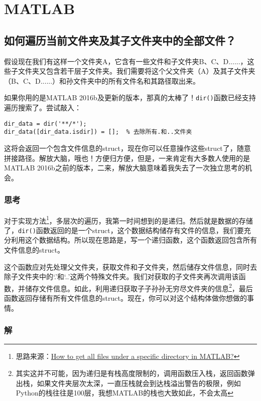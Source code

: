 \chapter{MATLAB}

\section{如何遍历当前文件夹及其子文件夹中的全部文件？}

假设现在我们有这样一个文件夹A，它含有一些文件和子文件夹B、C、D......，这些子文件夹又包含若干层子文件夹。我们需要将这个父文件夹（A）及其子文件夹（B、C、D......）和孙文件夹中的所有文件名和其路径取出来。

如果你用的是MATLAB 2016b及更新的版本，那真的太棒了！\texttt{dir()}函数已经支持遍历搜索了。尝试敲入：

\begin{verbatim}
dir_data = dir('**/*');
dir_data([dir_data.isdir]) = [];  % 去除所有.和..文件夹
\end{verbatim}

这将会返回一个包含文件信息的struct，现在你可以任意操作这些struct了，随意拼接路径。解放大脑，哦也！方便归方便，但是，一来肯定有大多数人使用的是MATLAB 2016b之前的版本，二来，解放大脑意味着我失去了一次独立思考的机会。

\subsection*{思考}

对于实现方法\footnote{思路来源：\href{https://stackoverflow.com/questions/2652630/how-to-get-all-files-under-a-specific-directory-in-matlab}{How to get all files under a specific directory in MATLAB?}}，多层次的遍历，我第一时间想到的是递归。然后就是数据的存储了，\texttt{dir()}函数返回的是一个struct，这个数据结构储存有文件的信息，我们要充分利用这个数据结构。所以现在思路是，写一个递归函数，这个函数返回包含所有文件信息的struct。

这个函数应对先处理父文件夹，获取文件和子文件夹，然后储存文件信息，同时去除子文件夹中的`.'和`..'这两个特殊文件夹。我们对获取的子文件夹再次调用该函数，并储存文件信息。如此，利用递归获取子子孙孙无穷尽文件夹的信息\footnote{其实这并不可能，因为递归是有栈高度限制的，调用函数压入栈，返回函数弹出栈，如果文件夹层次太深，一直压栈就会到达栈溢出警告的极限，例如Python的栈往往是100层，我想MATLAB的栈也大致如此，不会太高}，最后函数返回存储有所有文件信息的struct。现在，你可以对这个结构体做你想做的事情。

\subsection*{解}

